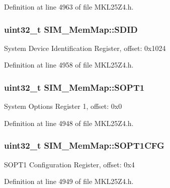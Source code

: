 Definition at line 4963 of file M\+K\+L25\+Z4.\+h.

\subsubsection[{\texorpdfstring{S\+D\+ID}{SDID}}]{\setlength{\rightskip}{0pt plus 5cm}uint32\+\_\+t S\+I\+M\+\_\+\+Mem\+Map\+::\+S\+D\+ID}\hypertarget{struct_s_i_m___mem_map_a536b8d3e185149c51e88387350e20fb3}{}\label{struct_s_i_m___mem_map_a536b8d3e185149c51e88387350e20fb3}
System Device Identification Register, offset\+: 0x1024 

Definition at line 4958 of file M\+K\+L25\+Z4.\+h.

\subsubsection[{\texorpdfstring{S\+O\+P\+T1}{SOPT1}}]{\setlength{\rightskip}{0pt plus 5cm}uint32\+\_\+t S\+I\+M\+\_\+\+Mem\+Map\+::\+S\+O\+P\+T1}\hypertarget{struct_s_i_m___mem_map_a1152a6ef88c78e762df97badf10b5050}{}\label{struct_s_i_m___mem_map_a1152a6ef88c78e762df97badf10b5050}
System Options Register 1, offset\+: 0x0 

Definition at line 4948 of file M\+K\+L25\+Z4.\+h.

\subsubsection[{\texorpdfstring{S\+O\+P\+T1\+C\+FG}{SOPT1CFG}}]{\setlength{\rightskip}{0pt plus 5cm}uint32\+\_\+t S\+I\+M\+\_\+\+Mem\+Map\+::\+S\+O\+P\+T1\+C\+FG}\hypertarget{struct_s_i_m___mem_map_a9b6ea6819e80eeaa90754b6e91fcc808}{}\label{struct_s_i_m___mem_map_a9b6ea6819e80eeaa90754b6e91fcc808}
S\+O\+P\+T1 Configuration Register, offset\+: 0x4 

Definition at line 4949 of file M\+K\+L25\+Z4.\+h.

